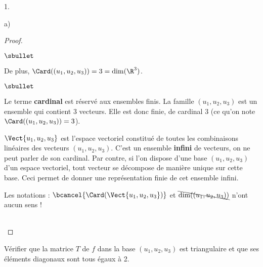 \begin{noliste}{1.}
\begin{noliste}{a)}
\begin{proof}
\begin{noliste}{$\sbullet$}
      \item De plus, $\Card((u_1, u_2, u_3)) = 3 = \dim(\R^3)$. %
        ~\\[-1.2cm]
      \end{noliste}
      \begin{remark}%
        \begin{noliste}{$\sbullet$}
        \item Le terme {\bf cardinal} est réservé aux ensembles
          finis. La famille $(u_1, u_2, u_3)$ est un ensemble qui
          contient $3$ vecteurs. Elle est donc finie, de cardinal $3$
          (ce qu'on note $\Card((u_1, u_2, u_3)) = 3$).

        \item $\Vect{u_1, u_2, u_3}$ est l'espace vectoriel constitué
          de toutes les combinaisons linéaires des vecteurs $(u_1,
          u_2, u_3)$. C'est un ensemble {\bf infini} de vecteurs, on
          ne peut parler de son cardinal. Par contre, si l'on dispose
          d'une base $(u_1, u_2, u_3)$ d'un espace vectoriel, tout
          vecteur se décompose de manière unique sur cette base. Ceci
          permet de donner une représentation finie de cet ensemble
          infini.

        \item Les notations : $\bcancel{\Card(\Vect{u_1, u_2, u_3})}$
          et $\bcancel{\dim((u_1, u_2, u_3))}$ n'ont aucun sens !
        \end{noliste}
      \end{remark}~\\[-1.4cm]
    \end{proof}		


    \newpage


  \item Vérifier que la matrice $T$ de $f$ dans la base
    $(u_{1},u_{2},u_{3})$ est triangulaire et que ses éléments
    diagonaux sont tous égaux à 2.


\end{noliste}
\end{noliste}
